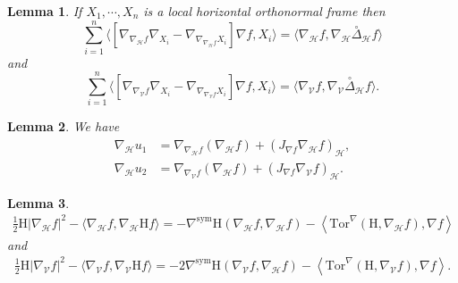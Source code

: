 \documentclass[10pt,a4paper]{amsart}
\newtheorem{lemma}{Lemma}
\newcommand{\Ho}{\mathcal H}
\newcommand{\V}{\mathcal V}
\begin{document}
	\begin{lemma}\label{partial hessian} 
		If $X_1,\cdots, X_n$ is a local horizontal orthonormal frame then
		\[
		\sum_{i=1}^n \langle[\nabla_{\nabla_\mathcal{H}f} \nabla_{X_i}-\nabla_{\nabla_{\nabla_\mathcal{H}f} X_i}] \nabla f, X_i \rangle=\langle \nabla_{\mathcal{H}} f , \nabla_{\mathcal{H}}\overset{\circ}\Delta_{\mathcal{H}} f \rangle
		\]
		and
		\[
		\sum_{i=1}^n \langle[\nabla_{\nabla_\mathcal{V}f} \nabla_{X_i}-\nabla_{\nabla_{\nabla_\mathcal{V}f} X_i}] \nabla f, X_i \rangle=\langle \nabla_{\mathcal{V}} f , \nabla_{\mathcal{V}}\overset{\circ}\Delta_{\mathcal{H}} f \rangle.
		\]
	\end{lemma}

	\begin{lemma}\label{horizontal-part-grad}
		We have
		\begin{align*}
			\nabla_{\mathcal{H}}u_1&=\nabla_{\nabla_\mathcal{H}f} (\nabla_\mathcal{H}f)+(J_{\nabla f}\nabla_\mathcal{H}f)_{\mathcal{H}},\\
			\nabla_{\mathcal{H}}u_2&=\nabla_{\nabla_\mathcal{V}f} (\nabla_\mathcal{H}f)+(J_{\nabla  f}\nabla_\mathcal{V}f)_{\mathcal{H}}.
		\end{align*}
	\end{lemma}

    \begin{lemma}\label{mean curvature part}
\begin{align*}
			\frac{1}{2}\mathrm H | \nabla_\Ho f|^2-\langle \nabla_{\mathcal{H}} f , \nabla_{\mathcal{H}} \mathrm H f \rangle=- \nabla^{\mathrm{sym}}\mathrm H(\nabla_\Ho f,\nabla_\Ho f)-\left\langle \mathrm{Tor}^\nabla (\mathrm H, \nabla_\Ho f), \nabla f \right\rangle 
		\end{align*}
		and
		\begin{align*}
			\frac{1}{2}\mathrm H | \nabla_\V f|^2-\langle \nabla_{\mathcal{V}} f , \nabla_{\mathcal{V}}\mathrm H f \rangle=-2\nabla^{\mathrm{sym}}\mathrm H(\nabla_\V f,\nabla_\Ho f)-\left\langle \mathrm{Tor}^\nabla (\mathrm H, \nabla_\V f), \nabla f \right\rangle.
		\end{align*}
    \end{lemma}
\end{document}
